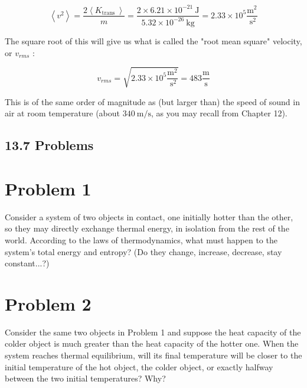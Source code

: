 \documentclass[10pt]{article}
\begin{document}
\begin{equation*}
\left\langle v^{2}\right\rangle=\frac{2\left\langle K_{\text {trans }}\right\rangle}{m}=\frac{2 \times 6.21 \times 10^{-21} \mathrm{~J}}{5.32 \times 10^{-26} \mathrm{~kg}}=2.33 \times 10^{5} \frac{\mathrm{m}^{2}}{\mathrm{~s}^{2}} \tag{13.25}
\end{equation*}


The square root of this will give us what is called the "root mean square" velocity, or $v_{r m s}$ :


\begin{equation*}
v_{r m s}=\sqrt{2.33 \times 10^{5} \frac{\mathrm{m}^{2}}{\mathrm{~s}^{2}}}=483 \frac{\mathrm{m}}{\mathrm{s}} \tag{13.26}
\end{equation*}


This is of the same order of magnitude as (but larger than) the speed of sound in air at room temperature (about $340 \mathrm{~m} / \mathrm{s}$, as you may recall from Chapter 12).

\subsection*{13.7 Problems}
\section*{Problem 1}
Consider a system of two objects in contact, one initially hotter than the other, so they may directly exchange thermal energy, in isolation from the rest of the world. According to the laws of thermodynamics, what must happen to the system's total energy and entropy? (Do they change, increase, decrease, stay constant...?)

\section*{Problem 2}
Consider the same two objects in Problem 1 and suppose the heat capacity of the colder object is much greater than the heat capacity of the hotter one. When the system reaches thermal equilibrium, will its final temperature will be closer to the initial temperature of the hot object, the colder object, or exactly halfway between the two initial temperatures? Why?
\end{document}
